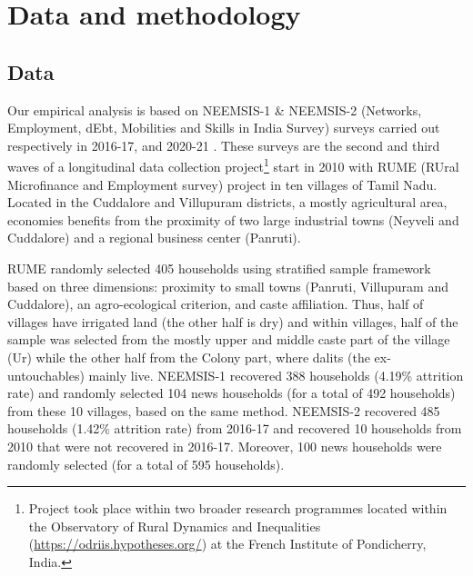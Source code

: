 \documentclass[a4paper, 12pt, onecolumn]{article}
\begin{document}
\section{Data and methodology}
\label{section:datamethodo}


	\subsection{Data}
	\label{subsection:data}

Our empirical analysis is based on NEEMSIS-1 \& NEEMSIS-2 (Networks, Employment, dEbt, Mobilities and Skills in India Survey) surveys carried out respectively in 2016-17, and 2020-21 \citep{NEEMSISreport, NEEMSIS2017}.
These surveys are the second and third waves of a longitudinal data collection project\footnote{Project took place within two broader research programmes located within the Observatory of Rural Dynamics and Inequalities (\url{https://odriis.hypotheses.org/}) at the French Institute of Pondicherry, India.} start in 2010 with RUME (RUral Microfinance and Employment survey) project in ten villages of Tamil Nadu.
Located in the Cuddalore and Villupuram districts, a mostly agricultural area, economies benefits from the proximity of two large industrial towns (Neyveli and Cuddalore) and a regional business center (Panruti).

RUME randomly selected 405 households using stratified sample framework based on three dimensions: proximity to small towns (Panruti, Villupuram and Cuddalore), an agro-ecological criterion, and caste affiliation.
Thus, half of villages have irrigated land (the other half is dry) and within villages, half of the sample was selected from the mostly upper and middle caste part of the village (Ur) while the other half from the Colony part, where dalits (the ex-untouchables) mainly live. 
NEEMSIS-1 recovered 388 households (4.19\% attrition rate) and randomly selected 104 news households (for a total of 492 households) from these 10 villages, based on the same method. 
NEEMSIS-2 recovered 485 households (1.42\% attrition rate) from 2016-17 and recovered 10 households from 2010 that were not recovered in 2016-17.
Moreover, 100 news households were randomly selected (for a total of 595 households).
\end{document}
